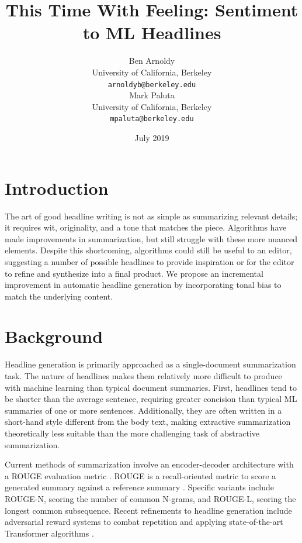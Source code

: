 \documentclass[11pt]{article}
\title{This Time With Feeling: Sentiment to ML Headlines}
\author{Ben Arnoldy \\
  University of California, Berkeley \\
  {\tt arnoldyb@berkeley.edu} \\\And
  Mark Paluta \\
  University of California, Berkeley \\
  {\tt mpaluta@berkeley.edu} \\}
\date{July 2019}
\begin{document}
\maketitle

\begin{abstract}
    
\end{abstract}

\section{Introduction}
The art of good headline writing is not as simple as summarizing relevant details; it requires wit, originality, and a tone that matches the piece. Algorithms have made improvements in summarization, but still struggle with these more nuanced elements. Despite this shortcoming, algorithms could still be useful to an editor, suggesting a number of possible headlines to provide inspiration or for the editor to refine and synthesize into a final product. We propose an incremental improvement in automatic headline generation by incorporating tonal bias to match the underlying content.

\section{Background}
Headline generation is primarily approached as a single-document summarization task. The nature of headlines makes them relatively more difficult to produce with machine learning than typical document summaries. First, headlines tend to be shorter than the average sentence, requiring greater concision than typical ML summaries of one or more sentences. Additionally, they are often written in a short-hand style different from the body text, making extractive summarization theoretically less suitable than the more challenging task of abstractive summarization. 

Current methods of summarization involve an encoder-decoder architecture \citep{rush2015neural} with a ROUGE evaluation metric \cite{Ayana2017}. ROUGE is a recall-oriented metric to score a generated summary against a reference summary \cite{lin-2004-rouge}. Specific variants include ROUGE-N, scoring the number of common N-grams, and ROUGE-L, scoring the longest common subsequence. Recent refinements to headline generation include adversarial reward systems to combat repetition \cite{DBLP:journals/corr/abs-1902-07110} and applying state-of-the-art Transformer algorithms \cite{DBLP:journals/corr/abs-1901-07786}.
\end{document}
